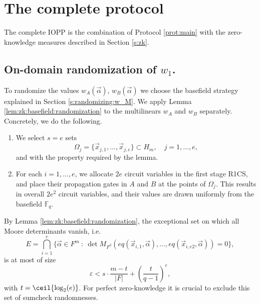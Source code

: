 \section{The complete protocol}
\label{s:complete protocol}

The complete IOPP is the combination of Protocol \ref{prot:main} with the zero-knowledge measures described in Section \ref{s:zk}.

\subsection{On-domain randomization of $w_1$.}

To randomize the values $w_A(\vec\alpha)$, $w_B(\vec\alpha)$ we choose the basefield strategy explained in Section \ref{s:randomizing:w_M}. 
We apply Lemma \ref{lem:zk:basefield:randomization} to the multilinears $w_A$ and $w_B$ separately.
Concretely, we do the following.
\begin{enumerate}
\item  
    We select $s =e$ sets 
    \begin{equation}
    \label{e:zk:propagation gates:points}
    \Omega_j = \{\vec x_{j,1}, \ldots, \vec x_{j,e}\}\subset H_m, \quad j=1,\ldots, e,
    \end{equation}
    and with the property required by the lemma. 
\item 
    For each $i=1,\ldots, e$, we allocate  $2e$ circuit variables in the first stage R1CS, and place their propagation gates in $A$ and $B$ at the points of $\Omega_j$. 
    This results in overall $2e^2$ circuit variables, and their values are drawn uniformly from the basefield $\mathbb F_q$.
\end{enumerate}



\noindent
By Lemma \ref{lem:zk:basefield:randomization}, the exceptional set on which all Moore determinants vanish, i.e.
\begin{equation}
\label{e:complete protocol:exceptional set}
E = \bigcap_{i=1}^e \{\vec\alpha\in F^m \::\: 
\det M_{F^2}(eq(\vec x_{i,1},\vec\alpha), \ldots, eq(\vec x_{i,e2},\vec\alpha)) = 0
\},
\end{equation}
is at most of size
\begin{equation}
\label{e:completeness:error}
\varepsilon < s\cdot \frac{m-t}{|F|} + \left(\frac{t}{q-1}\right)^e,
\end{equation}
with $t = \ceil{\log_2 (e)}$.
For perfect zero-knowledge it is crucial to exclude this set of sumcheck randomnesses.

